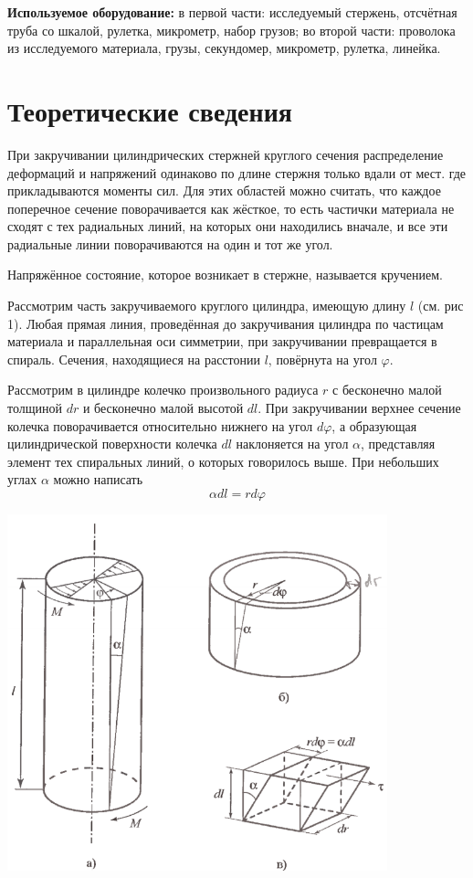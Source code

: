 \documentclass[a4paper, 12pt]{article} %
\begin{document}
\textbf{Используемое оборудование:} в первой части: исследуемый стержень, отсчётная труба со шкалой, рулетка, микрометр, набор грузов; во второй части: проволока из исследуемого материала, грузы,  секундомер, микрометр, рулетка, линейка.

\section{Теоретические сведения}

При закручивании цилиндрических стержней круглого сечения распределение деформаций и напряжений одинаково по длине стержня только вдали от мест. где прикладываются моменты сил. Для этих областей можно считать, что каждое поперечное сечение поворачивается как жёсткое, то есть частички материала не сходят с тех радиальных линий, на которых они находились вначале, и все эти радиальные линии поворачиваются на один и тот же угол.

Напряжённое состояние, которое возникает в стержне, называется кручением.

Рассмотрим часть закручиваемого круглого цилиндра, имеющую длину $l$ (см. рис 1). Любая прямая линия, проведённая до закручивания цилиндра по частицам материала и параллельная оси симметрии, при закручивании превращается в спираль. Сечения, находящиеся на расстонии $l$, повёрнута на угол $\varphi$.

Рассмотрим в цилиндре колечко произвольного радиуса $r$ с бесконечно малой толщиной $dr$ и бесконечно малой высотой $dl$. При закручивании верхнее сечение колечка поворачивается относительно нижнего на угол $d\varphi$, а образующая цилиндрической поверхности колечка $dl$ наклоняется на угол $\alpha$, представляя элемент тех спиральных линий, о которых говорилось выше. При небольших углах $\alpha$ можно написать
\[\alpha dl = r d\varphi\]

\begin{center}
	\includegraphics[width=11cm]{1}
\end{center} 
\end{document}

